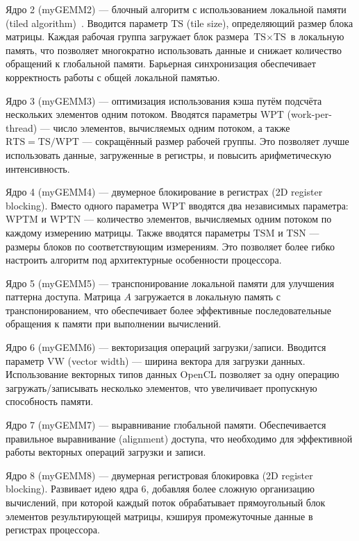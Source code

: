 Ядро 2 (myGEMM2) --- блочный алгоритм с использованием локальной памяти (tiled algorithm)~\cite{goto2008anatomy}. Вводится параметр $\text{TS}$ (tile size), определяющий размер блока матрицы. Каждая рабочая группа загружает блок размера $\text{TS} \times \text{TS}$ в локальную память, что позволяет многократно использовать данные и снижает количество обращений к глобальной памяти. Барьерная синхронизация обеспечивает корректность работы с общей локальной памятью.

Ядро 3 (myGEMM3) --- оптимизация использования кэша путём подсчёта нескольких элементов одним потоком. Вводятся параметры $\text{WPT}$ (work-per-thread) --- число элементов, вычисляемых одним потоком, а также $\text{RTS} = \text{TS}/\text{WPT}$ --- сокращённый размер рабочей группы. Это позволяет лучше использовать данные, загруженные в регистры, и повысить арифметическую интенсивность.

Ядро 4 (myGEMM4) --- двумерное блокирование в регистрах (2D register blocking). Вместо одного параметра $\text{WPT}$ вводятся два независимых параметра: $\text{WPTM}$ и $\text{WPTN}$ --- количество элементов, вычисляемых одним потоком по каждому измерению матрицы. Также вводятся параметры $\text{TSM}$ и $\text{TSN}$ --- размеры блоков по соответствующим измерениям. Это позволяет более гибко настроить алгоритм под архитектурные особенности процессора.

Ядро 5 (myGEMM5) --- транспонирование локальной памяти для улучшения паттерна доступа. Матрица $A$ загружается в локальную память с транспонированием, что обеспечивает более эффективные последовательные обращения к памяти при выполнении вычислений.

Ядро 6 (myGEMM6) --- векторизация операций загрузки/записи. Вводится параметр $\text{VW}$ (vector width) --- ширина вектора для загрузки данных. Использование векторных типов данных OpenCL позволяет за одну операцию загружать/записывать несколько элементов, что увеличивает пропускную способность памяти.

Ядро 7 (myGEMM7) --- выравнивание глобальной памяти. Обеспечивается правильное выравнивание (alignment) доступа, что необходимо для эффективной работы векторных операций загрузки и записи.

Ядро 8 (myGEMM8) --- двумерная регистровая блокировка (2D register blocking). Развивает идею ядра 6, добавляя более сложную организацию вычислений, при которой каждый поток обрабатывает прямоугольный блок элементов результирующей матрицы, кэшируя промежуточные данные в регистрах процессора.

